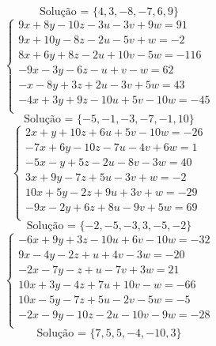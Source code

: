 \documentclass[12pt,oneside,a4paper]{article}
\begin{document}
\begin{equation*}
\text{Solução = }\{4,3,-8,-7,6,9\}
\end{equation*}
\vspace{\baselineskip}
\begin{equation*}
\begin{cases}
9x+8y-10z-3u-3v+9w=91 \\
9x+10y-8z-2u-5v+w=-2 \\
8x+6y+8z-2u+10v-5w=-116 \\
-9x-3y-6z-u+v-w=62 \\
-x-8y+3z+2u-3v+5w=43 \\
-4x+3y+9z-10u+5v-10w=-45 \\
\end{cases}
\end{equation*}
\begin{equation*}
\text{Solução = }\{-5,-1,-3,-7,-1,10\}
\end{equation*}
\vspace{\baselineskip}
\begin{equation*}
\begin{cases}
2x+y+10z+6u+5v-10w=-26 \\
-7x+6y-10z-7u-4v+6w=1 \\
-5x-y+5z-2u-8v-3w=40 \\
3x+9y-7z+5u-3v+w=-2 \\
10x+5y-2z+9u+3v+w=-29 \\
-9x-2y+6z+8u-9v+5w=69 \\
\end{cases}
\end{equation*}
\begin{equation*}
\text{Solução = }\{-2,-5,-3,3,-5,-2\}
\end{equation*}
\vspace{\baselineskip}
\begin{equation*}
\begin{cases}
-6x+9y+3z-10u+6v-10w=-32 \\
9x-4y-2z+u+4v-3w=-20 \\
-2x-7y-z+u-7v+3w=21 \\
10x+3y-4z+7u+10v-w=-66 \\
10x-5y-7z+5u-2v-5w=-5 \\
-2x-9y-10z-2u-10v-9w=-28 \\
\end{cases}
\end{equation*}
\begin{equation*}
\text{Solução = }\{7,5,5,-4,-10,3\}
\end{equation*}
\end{document}
